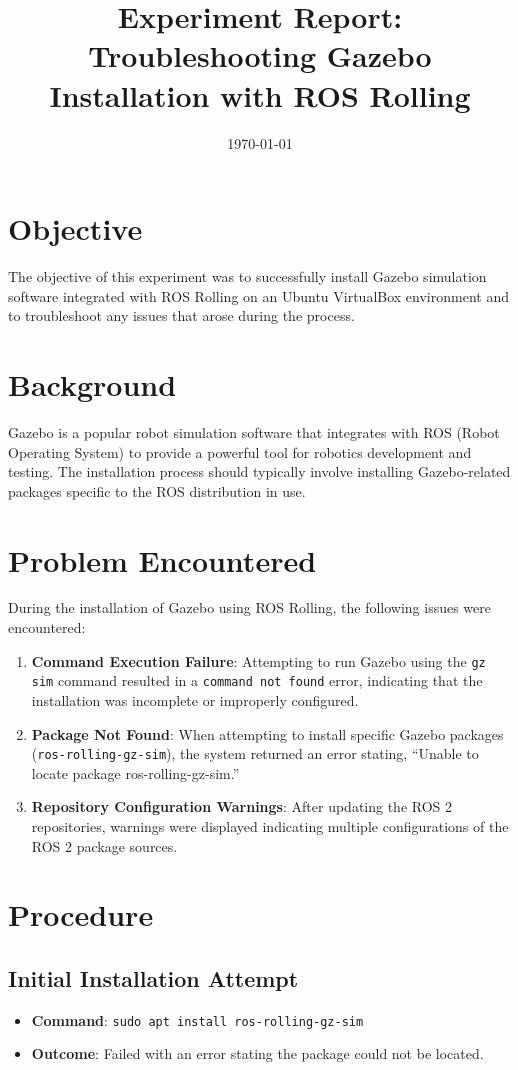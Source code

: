 \documentclass{article}
\title{Experiment Report: Troubleshooting Gazebo Installation with ROS Rolling}
\author{}
\date{\today}
\begin{document}
\maketitle

\section*{Objective}
The objective of this experiment was to successfully install Gazebo simulation software integrated with ROS Rolling on an Ubuntu VirtualBox environment and to troubleshoot any issues that arose during the process.

\section*{Background}
Gazebo is a popular robot simulation software that integrates with ROS (Robot Operating System) to provide a powerful tool for robotics development and testing. The installation process should typically involve installing Gazebo-related packages specific to the ROS distribution in use.

\section*{Problem Encountered}
During the installation of Gazebo using ROS Rolling, the following issues were encountered:
\begin{enumerate}
    \item \textbf{Command Execution Failure}: Attempting to run Gazebo using the \texttt{gz sim} command resulted in a \texttt{command not found} error, indicating that the installation was incomplete or improperly configured.
    \item \textbf{Package Not Found}: When attempting to install specific Gazebo packages (\texttt{ros-rolling-gz-sim}), the system returned an error stating, ``Unable to locate package ros-rolling-gz-sim.''
    \item \textbf{Repository Configuration Warnings}: After updating the ROS 2 repositories, warnings were displayed indicating multiple configurations of the ROS 2 package sources.
\end{enumerate}

\section*{Procedure}
\subsection*{Initial Installation Attempt}
\begin{itemize}
    \item \textbf{Command}: \texttt{sudo apt install ros-rolling-gz-sim}
    \item \textbf{Outcome}: Failed with an error stating the package could not be located.
\end{itemize}
\end{document}
